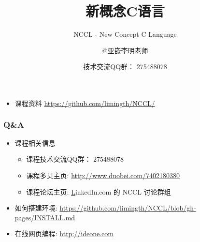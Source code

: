 \documentclass[11pt]{beamer}
\title{新概念C语言}
\subtitle{NCCL - New Concept C Language}
\author{@亚嵌李明老师}
\date{技术交流QQ群： 275488078}
\institute{www.akaedu.org}
\begin{document}
\begin{frame}
\titlepage
\begin{itemize}
\item 	课程资料 \url{https://github.com/limingth/NCCL/}
\end{itemize}
\end{frame}





\begin{frame}\frametitle{Q\&A}
\begin{itemize}
\item 	
	课程相关信息	
	\begin{itemize}
	\item 	
	课程技术交流QQ群： 275488078
	\item 	
	课程多贝主页: \url{http://www.duobei.com/7402180380}
	\item 	
	课程论坛主页: \href{http://www.linkedin.com/groups/Welcome-NCCL-group-4715078.S.185251633?qid=dce08638-0f74-4014-b9ad-ecab2ec33c5c&trk=group_most_popular-0-b-ttl&goback=.gsm_4715078_1_*2_*2_*2_lna_PENDING_*2.gmp_4715078.gde_4715078_member_185251633.gmp_4715078.gde_4715078_member_188465347.gmp_4715078} LinkedIn.com 的 NCCL 讨论群组
	\end{itemize}
\item 	
	如何搭建环境: 
	\url{https://github.com/limingth/NCCL/blob/gh-pages/INSTALL.md} 
\item 	
在线网页编程: \url{http://ideone.com}
\end{itemize}
\end{frame}
\end{document}
